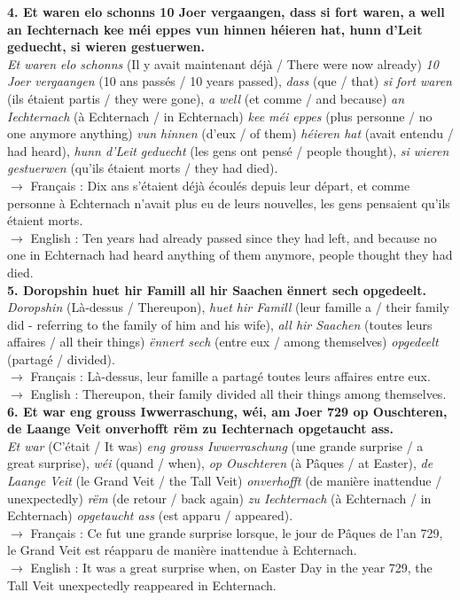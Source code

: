 \textbf{4. Et waren elo schonns 10 Joer vergaangen, dass si fort waren, a well an Iechternach kee méi eppes vun hinnen héieren hat, hunn d'Leit geduecht, si wieren gestuerwen.}\\
\textit{Et waren elo schonns} (Il y avait maintenant déjà / There were now already) \textit{10 Joer vergaangen} (10 ans passés / 10 years passed), \textit{dass} (que / that) \textit{si fort waren} (ils étaient partis / they were gone), \textit{a well} (et comme / and because) \textit{an Iechternach} (à Echternach / in Echternach) \textit{kee méi eppes} (plus personne / no one anymore anything) \textit{vun hinnen} (d'eux / of them) \textit{héieren hat} (avait entendu / had heard), \textit{hunn d'Leit geduecht} (les gens ont pensé / people thought), \textit{si wieren gestuerwen} (qu'ils étaient morts / they had died).\\
$\rightarrow$ Français : Dix ans s'étaient déjà écoulés depuis leur départ, et comme personne à Echternach n'avait plus eu de leurs nouvelles, les gens pensaient qu'ils étaient morts.\\
$\rightarrow$ English : Ten years had already passed since they had left, and because no one in Echternach had heard anything of them anymore, people thought they had died.\\[0.5em]

\textbf{5. Doropshin huet hir Famill all hir Saachen ënnert sech opgedeelt.}\\
\textit{Doropshin} (Là-dessus / Thereupon), \textit{huet hir Famill} (leur famille a / their family did - referring to the family of him and his wife), \textit{all hir Saachen} (toutes leurs affaires / all their things) \textit{ënnert sech} (entre eux / among themselves) \textit{opgedeelt} (partagé / divided).\\
$\rightarrow$ Français : Là-dessus, leur famille a partagé toutes leurs affaires entre eux.\\
$\rightarrow$ English : Thereupon, their family divided all their things among themselves.\\[0.5em]

\textbf{6. Et war eng grouss Iwwerraschung, wéi, am Joer 729 op Ouschteren, de Laange Veit onverhofft rëm zu Iechternach opgetaucht ass.}\\
\textit{Et war} (C'était / It was) \textit{eng grouss Iwwerraschung} (une grande surprise / a great surprise), \textit{wéi} (quand / when), \textit{op Ouschteren} (à Pâques / at Easter), \textit{de Laange Veit} (le Grand Veit / the Tall Veit) \textit{onverhofft} (de manière inattendue / unexpectedly) \textit{rëm} (de retour / back again) \textit{zu Iechternach} (à Echternach / in Echternach) \textit{opgetaucht ass} (est apparu / appeared).\\
$\rightarrow$ Français : Ce fut une grande surprise lorsque, le jour de Pâques de l'an 729, le Grand Veit est réapparu de manière inattendue à Echternach.\\
$\rightarrow$ English : It was a great surprise when, on Easter Day in the year 729, the Tall Veit unexpectedly reappeared in Echternach.\\[0.5em]

